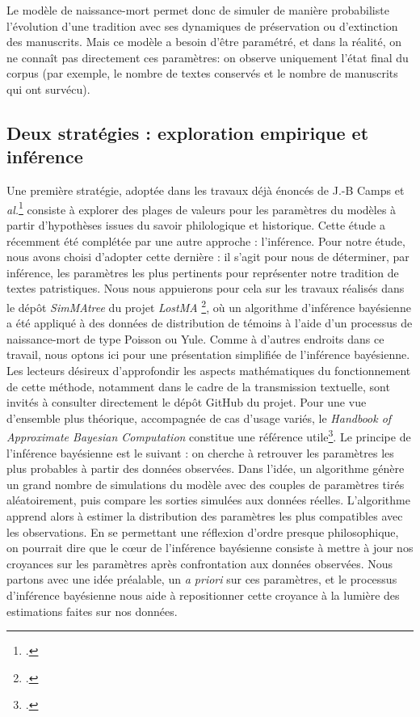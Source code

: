 \documentclass[a4paper,twoside,12pt]{book}
\begin{document}
Le modèle de naissance-mort permet donc de simuler de manière probabiliste l’évolution d’une tradition avec ses dynamiques de préservation ou d'extinction des manuscrits. Mais ce modèle a besoin d'être paramétré, et dans la réalité, on ne connaît pas directement ces paramètres: on observe uniquement l’état final du corpus (par exemple, le nombre de textes conservés et le nombre de manuscrits qui ont survécu). 

\subsection{Deux stratégies : exploration empirique et inférence}

Une première stratégie, adoptée dans les travaux déjà énoncés de J.-B Camps et \textit{al.}\footcite{Camps2022, camps_transmission_2025} consiste à explorer des plages de valeurs pour les paramètres du modèles à partir d’hypothèses issues du savoir philologique et historique. Cette étude a récemment été complétée par une autre approche : l’inférence. Pour notre étude, nous avons choisi d’adopter cette dernière : il s’agit pour nous de déterminer, par inférence, les paramètres les plus pertinents pour représenter notre tradition de textes patristiques. Nous nous appuierons pour cela sur les travaux réalisés dans le dépôt \textit{SimMAtree} du projet \textit{LostMA} \footcite{simmatree_github}, où un algorithme d’inférence bayésienne a été appliqué à des données de distribution de témoins à l’aide d’un processus de naissance-mort de type Poisson ou Yule. Comme à d’autres endroits dans ce travail, nous optons ici pour une présentation simplifiée de l’inférence bayésienne. Les lecteurs désireux d’approfondir les aspects mathématiques du fonctionnement de cette méthode, notamment dans le cadre de la transmission textuelle, sont invités à consulter directement le dépôt GitHub du projet. Pour une vue d’ensemble plus théorique, accompagnée de cas d’usage variés, le \textit{Handbook of Approximate Bayesian Computation} constitue une référence utile\footcite{sisson}. Le principe de l'inférence bayésienne est le suivant : on cherche à retrouver les paramètres les plus probables à partir des données observées. Dans l'idée,  un  algorithme génère un grand nombre de simulations du modèle avec des couples de paramètres tirés aléatoirement, puis compare les sorties simulées aux données réelles. L’algorithme apprend alors à estimer la distribution des paramètres les plus compatibles avec les observations. En se permettant une réflexion d’ordre presque philosophique, on pourrait dire que le cœur de l’inférence bayésienne consiste à mettre à jour nos croyances sur les paramètres après confrontation aux données observées. Nous partons avec une idée préalable, un \textit{a priori} sur ces paramètres, et le processus d'inférence bayésienne nous aide à repositionner cette croyance à la lumière des estimations faites sur nos données.
\end{document}

